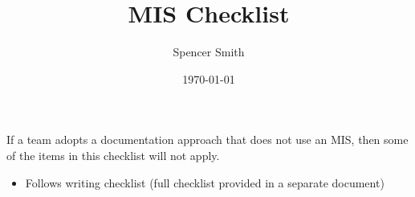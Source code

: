 \documentclass[12pt]{article}
\begin{document}
\title{MIS Checklist}
\author{Spencer Smith}
\date{\today}

\maketitle

If a team adopts a documentation approach that does not use an MIS, then some of
the items in this checklist will not apply.

\begin{itemize}
 
\item Follows writing checklist (full checklist provided in a separate document)


\end{itemize}
\end{document}
